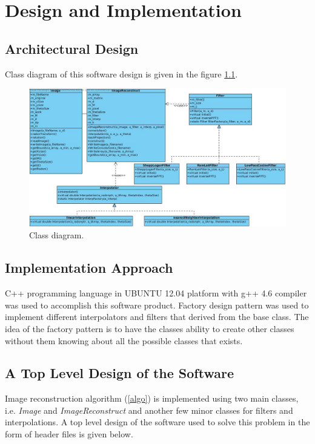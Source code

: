 
\chapter{Design and Implementation} %

\label{Chapter3} %



\section{Architectural Design}
Class diagram of this software design is given in the figure \ref{fig:cd}. 
\begin{figure}[H]
	\centering
		\includegraphics[width=490pt]{Figures/cd.jpg}
	\caption[Class diagram.]{Class diagram.}
	\label{fig:cd}
\end{figure}
\section{Implementation Approach}
C++ programming language in UBUNTU 12.04 platform with g++ 4.6 compiler was used to accomplish this software product. Factory design pattern was used to implement different interpolators and filters that derived from the base class. The idea of the factory pattern is to have the classes ability to create other classes without them knowing about all the possible classes that exists. 

\section{A Top Level Design of the Software}
Image reconstruction algorithm (\ref{algo}) is implemented using two main classes, i.e. \textit{Image} and \textit{ImageReconstruct} and another few minor classes for filters and interpolations. A top level design of the software used to solve this problem in the form of header files is given below.
